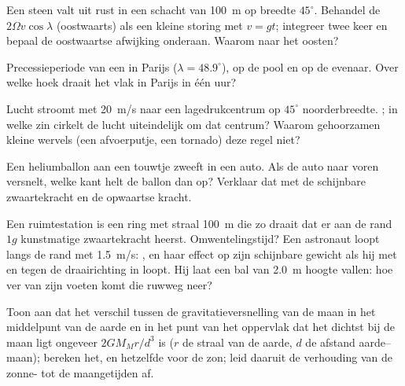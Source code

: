\begin{exercise}[$\star\star$]\label{exo:b1:non-inertial-frames:7}
Een steen valt uit rust in een schacht van \qty{100}{m} op breedte $45^\circ$.
Behandel de  $2\Omega v\cos\lambda$ (oostwaarts) als een kleine
storing met $v = gt$; integreer twee keer en bepaal de oostwaartse
afwijking onderaan. Waarom naar het oosten?
\end{exercise}

\begin{exercise}[$\star\star$]\label{exo:b1:non-inertial-frames:8}
Precessieperiode van een  in Parijs ($\lambda = 48.9^\circ$),
op de pool en op de evenaar. Over welke hoek draait het vlak
in Parijs in één uur?
\end{exercise}

\begin{exercise}[$\star\star$]\label{exo:b1:non-inertial-frames:9}
Lucht stroomt met \qty{20}{m/s} naar een lagedrukcentrum op $45^\circ$
noorderbreedte. ; in welke zin cirkelt de lucht
uiteindelijk om dat centrum? Waarom gehoorzamen kleine wervels (een afvoerputje,
een tornado) deze regel niet?
\end{exercise}

\begin{exercise}[$\star\star\star$]\label{exo:b1:non-inertial-frames:10}
Een heliumballon aan een touwtje zweeft in een auto. Als de auto naar voren
versnelt, welke kant helt de ballon dan op? Verklaar dat met de
schijnbare zwaartekracht en de opwaartse kracht.
\end{exercise}

\begin{exercise}[$\star\star\star$]\label{exo:b1:non-inertial-frames:11}
Een ruimtestation is een ring met straal \qty{100}{m} die zo draait dat er aan de
rand $1g$ kunstmatige zwaartekracht heerst. Omwentelingstijd? Een astronaut loopt
langs de rand met \qty{1.5}{m/s}: , en haar effect op zijn
schijnbare gewicht als hij met en tegen de draairichting in loopt. Hij laat een
bal van \qty{2.0}{m} hoogte vallen: hoe ver van zijn voeten komt die ruwweg neer?
\end{exercise}

\begin{exercise}[$\star\star\star$]\label{exo:b1:non-inertial-frames:12}
Toon aan dat het verschil tussen de gravitatieversnelling van de maan
in het middelpunt van de aarde en in het punt van het oppervlak dat het dichtst bij
de maan ligt ongeveer $2GM_Mr/d^3$ is ($r$ de straal van de aarde, $d$ de afstand
aarde--maan); bereken het, en hetzelfde voor de zon; leid daaruit de verhouding
van de zonne- tot de maangetijden af.
\end{exercise}

